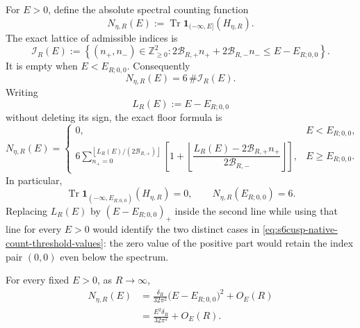 For \(E>0\), define the absolute spectral counting function
\begin{equation}\label{eq:s6cusp-native-count-definition}
 N_{\eta,R}(E):=
 \operatorname{Tr}\mathbf1_{(-\infty,E]}(H_{\eta,R}).
\end{equation}
The exact lattice of admissible indices is
\begin{equation}\label{eq:s6cusp-native-count-index-set}
 \mathscr I_R(E):=
 \left\{(n_+,n_-)\in\mathbb Z_{\ge0}^2:
  2\mathcal B_{R,+}n_++2\mathcal B_{R,-}n_-
  \le E-E_{R;0,0}\right\}.
\end{equation}
It is empty when \(E<E_{R;0,0}\).  Consequently
\begin{equation}\label{eq:s6cusp-native-count-cardinality}
 N_{\eta,R}(E)=6\,\#\mathscr I_R(E).
\end{equation}
Writing
\begin{equation}\label{eq:s6cusp-native-count-L}
 L_R(E):=E-E_{R;0,0}
\end{equation}
without deleting its sign, the exact floor formula is
\begin{equation}\label{eq:s6cusp-native-count-piecewise}
 N_{\eta,R}(E)=
 \begin{cases}
 0,&E<E_{R;0,0},\\[0.4em]
 6\displaystyle\sum_{n_+=0}^{
   \left\lfloor L_R(E)/(2\mathcal B_{R,+})\right\rfloor}
 \left[
  1+\left\lfloor
  \dfrac{L_R(E)-2\mathcal B_{R,+}n_+}
        {2\mathcal B_{R,-}}
  \right\rfloor
 \right],&E\ge E_{R;0,0}.
 \end{cases}
\end{equation}
In particular,
\begin{equation}\label{eq:s6cusp-native-count-threshold-values}
 \operatorname{Tr}\mathbf1_{(-\infty,E_{R;0,0})}(H_{\eta,R})=0,
 \qquad
 N_{\eta,R}(E_{R;0,0})=6.
\end{equation}
Replacing \(L_R(E)\) by
\((E-E_{R;0,0})_+\) inside the second line while using that line for every
\(E>0\) would identify the two distinct cases in
\eqref{eq:s6cusp-native-count-threshold-values}: the zero value of the
positive part would retain the index pair \((0,0)\) even below the spectrum.

\begin{theorem}
\label{thm:s6cusp-native-fixed-energy-count}
For every fixed \(E>0\), as \(R\to\infty\),
\begin{align}
 N_{\eta,R}(E)
 &=\frac{\delta_R}{32\pi^2}
   \bigl(E-E_{R;0,0}\bigr)^2+O_E(R)
 \label{eq:s6cusp-native-fixed-energy-count-ground}\\
 &=\frac{E^2\delta_R}{32\pi^2}+O_E(R).
 \label{eq:s6cusp-native-fixed-energy-count-leading}
\end{align}
\end{theorem}


